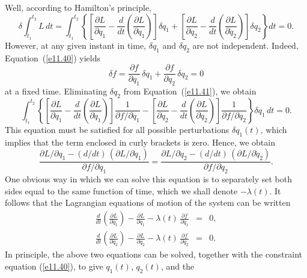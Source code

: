 Well, according to Hamilton's principle, 
\begin{equation}\label{e11.41}
\delta\int_{t_1}^{t_2} L\,dt = \int_{t_1}^{t_2}\left\{\left[
\frac{\partial L}{\partial q_1}-\frac{d}{dt}\!\left(\frac{\partial L}{\partial \dot{q}_1}\right)\right]\delta q_1+ \left[
\frac{\partial L}{\partial q_2}-\frac{d}{dt}\!\left(\frac{\partial L}{\partial \dot{q}_2}\right)\right]\delta q_2 \right\} dt=0.
\end{equation}
However, at any given instant in time, $\delta q_1$ and $\delta q_2$ are not independent. Indeed,
Equation~(\ref{e11.40}) yields
\begin{equation}
\delta f = \frac{\partial f}{\partial q_1}\,\delta q_1 + \frac{\partial f}{\partial
q_2}\,\delta q_2 = 0
\end{equation}
at a fixed time. Eliminating $\delta q_2$ from Equation~(\ref{e11.41}), we obtain
\begin{equation}
\int_{t_1}^{t_2}\left\{\left[
\frac{\partial L}{\partial q_1}-\frac{d}{dt}\!\left(\frac{\partial L}{\partial \dot{q}_1}\right)\right]\frac{1}{\partial f/\partial q_1}- \left[
\frac{\partial L}{\partial q_2}-\frac{d}{dt}\!\left(\frac{\partial L}{\partial \dot{q}_2}\right)\right]\frac{1}{\partial f/\partial q_2}\right\} \delta q_1\,dt=0.
\end{equation}
This equation must be satisfied for all possible perturbations $\delta q_1(t)$, which implies that the term enclosed in curly brackets is zero.
Hence, we obtain
\begin{equation}
\frac{\partial L/\partial q_1-(d/dt)\,(\partial L/\partial \dot{q}_1)}{\partial f/\partial q_1} = \frac{\partial L/\partial q_2-(d/dt)\,(\partial L/\partial \dot{q}_2)}{\partial f/\partial q_2}.
\end{equation}
One obvious way in which we can solve this equation is to separately set both sides
equal to the same function of time, which
we shall denote $-\lambda(t)$. It follows that the Lagrangian equations of
motion of the system can be written
\begin{eqnarray}\label{e11.45}
\frac{d}{dt}\!\left(\frac{\partial L}{\partial \dot{q}_1}\right)-\frac{\partial L}{\partial q_1} - \lambda(t)\,\frac{\partial f}{\partial q_1}& =& 0,\\[0.5ex]
\frac{d}{dt}\!\left(\frac{\partial L}{\partial \dot{q}_2}\right)-\frac{\partial L}{\partial q_2} - \lambda(t)\,\frac{\partial f}{\partial q_2}& =& 0.\label{e11.46}
\end{eqnarray}
In principle, the above two equations can be solved, together with the constraint equation (\ref{e11.40}), to give $q_1(t)$, $q_2(t)$, and the
